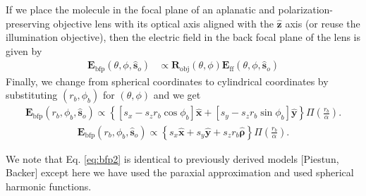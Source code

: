 \documentclass{osa-article}
\providecommand{\mb}[1]{\mathbf{#1}}
\providecommand{\so}{\mathbf{\hat{s}}_o}
\providecommand{\mh}[1]{\mathbf{\hat{#1}}}
\providecommand{\bs}[1]{\boldsymbol{#1}}
\begin{document}
If we place the molecule in the focal plane of an aplanatic and
polarization-preserving objective lens with its optical axis aligned with the
$\mh{z}$ axis (or reuse the illumination objective), then the electric field in
the back focal plane of the lens is given by
\begin{align}
  \mb{E}_{\text{bfp}}(\theta, \phi, \so) &\propto \mb{R}_{\text{obj}}(\theta,\phi)\mb{E}_{\text{ff}}(\theta, \phi, \so)
\end{align}
Finally, we change from spherical coordinates to cylindrical coordinates by
substituting $(r_b, \phi_b)$ for $(\theta, \phi)$ and we get
\begin{align}
  \mb{E}_{\text{bfp}}(r_b, \phi_b, \so{}) \propto \left\{\left[s_x - s_zr_b\cos\phi_b\right]\mh{x} + \left[s_y - s_z r_b\sin\phi_b\right]\mh{y}\right\}\Pi\left(\frac{r_b}{\alpha}\right). \label{eq:bfp2}
\end{align}
\begin{align}
  \mb{E}_{\text{bfp}}(r_b, \phi_b, \so{}) \propto \left\{s_x\mh{x} + s_y\mh{y} + s_z r_b \mh{\bs{\rho}}\right\}\Pi\left(\frac{r_b}{\alpha}\right). \label{eq:bfp3}
\end{align}

We note that Eq. \ref{eq:bfp2} is identical to previously derived models
[Piestun, Backer] except here we have used the paraxial approximation and used
spherical harmonic functions.
\end{document}
